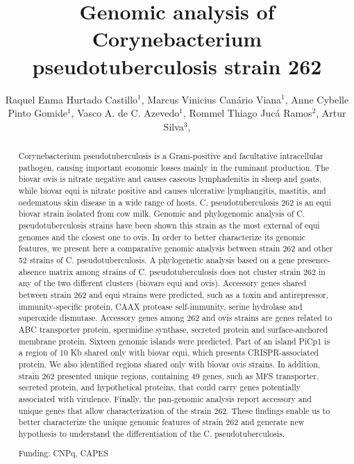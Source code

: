 \documentclass[twoside]{article}
\title{\vspace{-15mm}\fontsize{24pt}{10pt}\selectfont\textbf{ Genomic analysis of Corynebacterium pseudotuberculosis strain 262 }} %
\author{ Raquel Enma Hurtado Castillo$^{1}$, Marcus Vinicius Canário Viana$^{1}$, Anne Cybelle Pinto Gomide$^{1}$, Vasco A. de C. Azevedo$^{1}$, Rommel Thiago Jucá Ramos$^{2}$, Artur Silva$^{3}$, }
\affil{ 1 Federal University of Minas Gerais

2 Univsersidade Federal do Para

3 Federal University of Pará

 }
\date{}
\begin{document}
  
  
  \maketitle %
  
  
  \thispagestyle{fancy} %
  
  
  \begin{abstract}
  Corynebacterium pseudotuberculosis is a Gram-positive and facultative intracellular pathogen, causing important economic losses mainly in the ruminant production. The biovar ovis is nitrate negative and causes caseous lymphadenitis in sheep and goats, while biovar equi is nitrate positive and causes ulcerative lymphangitis, mastitis, and oedematous skin disease in a wide range of hosts. C. pseudotuberculosis 262 is an equi biovar strain isolated from cow milk. Genomic and phylogenomic analysis of C. pseudotuberculosis strains have been shown this strain as the most external of equi genomes and the closest one to ovis. In order to better characterize its genomic features, we present here a comparative genomic analysis between strain 262 and other 52 strains of C. pseudotuberculosis. A phylogenetic analysis based on a gene presence-absence matrix among strains of C. pseudotuberculosis does not cluster strain 262 in any of the two different clusters (biovars equi and ovis). Accessory genes shared between strain 262 and equi strains were predicted, such as a toxin and antirepressor, immunity-specific protein, CAAX protease self-immunity, serine hydrolase and superoxide dismutase. Accessory genes among 262 and ovis strains are genes related to ABC transporter protein, spermidine synthase, secreted protein and surface-anchored membrane protein. Sixteen genomic islands were predicted. Part of an island PiCp1 is a region of 10 Kb shared only with biovar equi, which presents CRISPR-associated protein. We also identified regions shared only with biovar ovis strains. In addition, strain 262 presented unique regions, containing 49 genes, such as MFS transporter, secreted protein, and hypothetical proteins, that could carry genes potentially associated with virulence. Finally, the pan-genomic analysis report accessory and unique genes that allow characterization of the strain 262. These findings enable us to better characterize the unique genomic features of strain 262 and generate new hypothesis to understand the differentiation of the C. pseudotuberculosis.
  
  Funding: CNPq, CAPES \\ 
  \end{abstract}
  
\end{document}
